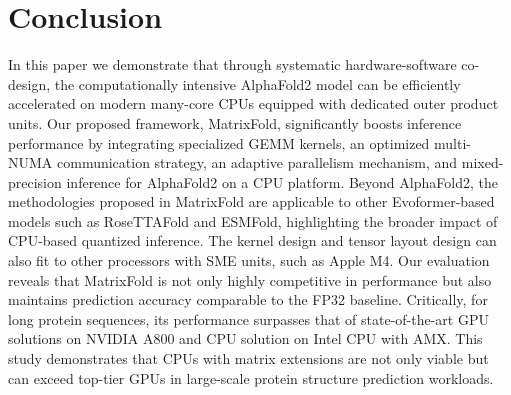 \section{Conclusion}
\label{sec:conclusion}
In this paper we demonstrate that through systematic hardware-software co-design, the computationally intensive AlphaFold2 model can be efficiently accelerated on modern many-core CPUs equipped with dedicated outer product units. Our proposed framework, MatrixFold, significantly boosts inference performance by integrating specialized GEMM kernels, an optimized multi-NUMA communication strategy, an adaptive parallelism mechanism, and mixed-precision inference for AlphaFold2 on a CPU platform.
Beyond AlphaFold2, the methodologies proposed in MatrixFold are applicable to other Evoformer-based models such as RoseTTAFold and ESMFold, highlighting the broader impact of CPU-based quantized inference. The kernel design and tensor layout design can also fit to other processors with SME units, such as Apple M4.
Our evaluation reveals that MatrixFold is not only highly competitive in performance but also maintains prediction accuracy comparable to the FP32 baseline. Critically, for long protein sequences, its performance surpasses that of state-of-the-art GPU solutions on NVIDIA A800 and CPU solution on Intel CPU with AMX.
This study demonstrates that CPUs with matrix extensions are not only viable but can exceed top-tier GPUs in large-scale protein structure prediction workloads.
